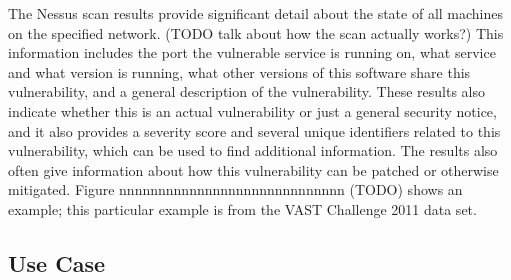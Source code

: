 \documentclass{acm_proc_article-sp}
\begin{document}
The Nessus scan results provide significant detail about the state of all machines on the specified network.
(TODO talk about how the scan actually works?) This information includes the port the vulnerable service is running on, what service and what version is running, what other versions of this software share this vulnerability, and a general description of the vulnerability.
These results also indicate whether this is an actual vulnerability or just a general security notice, and it also provides a severity score and several unique identifiers related to this vulnerability, which can be used to find additional information.
The results also often give information about how this vulnerability can be patched or otherwise mitigated.
Figure nnnnnnnnnnnnnnnnnnnnnnnnnnnnn (TODO) shows an example; this particular example is from the VAST Challenge 2011 data set.




\subsection{Use Case}
\end{document}
